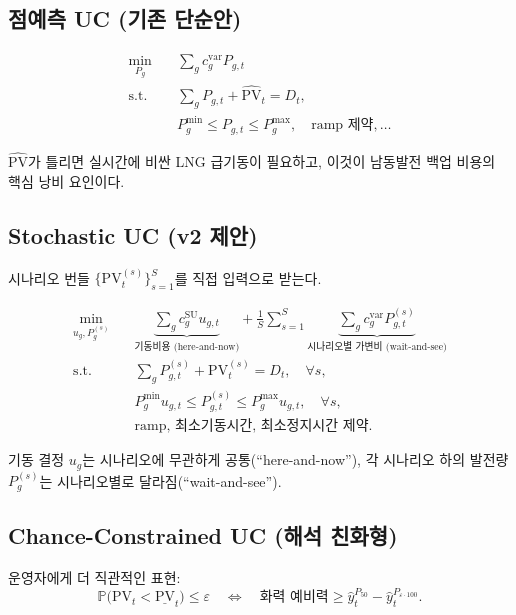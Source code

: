 \documentclass[11pt,a4paper]{article}
\begin{document}
\subsection{점예측 UC (기존 단순안)}

\begin{align}
    \min_{P_g}\quad & \sum_g c_g^{\mathrm{var}} P_{g,t} \\
    \text{s.t.}\quad & \sum_g P_{g,t} + \hat{\mathrm{PV}}_t = D_t, \\
    & P_g^{\min}\le P_{g,t}\le P_g^{\max}, \quad \text{ramp 제약}, \dots
\end{align}

$\hat{\mathrm{PV}}$가 틀리면 실시간에 비싼 LNG 급기동이 필요하고, 이것이 남동발전 백업 비용의 핵심 낭비 요인이다.

\subsection{Stochastic UC (v2 제안)}

시나리오 번들 $\{\mathrm{PV}^{(s)}_t\}_{s=1}^{S}$를 직접 입력으로 받는다.

\begin{align}
    \min_{u_g, P_g^{(s)}}\quad & \underbrace{\sum_g c_g^{\mathrm{SU}} u_{g,t}}_{\text{기동비용 (here-and-now)}} + \frac{1}{S}\sum_{s=1}^{S}\underbrace{\sum_g c_g^{\mathrm{var}} P_{g,t}^{(s)}}_{\text{시나리오별 가변비 (wait-and-see)}} \\
    \text{s.t.}\quad & \sum_g P_{g,t}^{(s)} + \mathrm{PV}^{(s)}_t = D_t,\quad \forall s, \\
    & P_g^{\min} u_{g,t}\le P_{g,t}^{(s)}\le P_g^{\max} u_{g,t},\quad \forall s, \\
    & \text{ramp, 최소기동시간, 최소정지시간 제약}.
\end{align}

기동 결정 $u_g$는 시나리오에 무관하게 공통(``here-and-now''), 각 시나리오 하의 발전량 $P_g^{(s)}$는 시나리오별로 달라짐(``wait-and-see'').

\subsection{Chance-Constrained UC (해석 친화형)}

운영자에게 더 직관적인 표현:
\begin{equation}
    \mathbb{P}\bigl(\mathrm{PV}_t < \underline{\mathrm{PV}}_t\bigr) \le \varepsilon\quad\Longleftrightarrow\quad \text{화력 예비력} \ge \hat y^{P_{50}}_t - \hat y^{P_{\varepsilon\cdot 100}}_t.
\end{equation}
\end{document}
